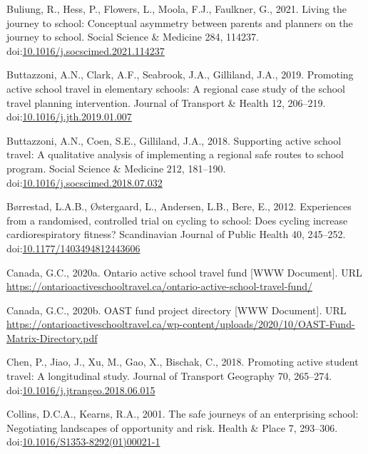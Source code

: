 \documentclass[]{elsarticle} %
\begin{document}
\leavevmode\hypertarget{ref-buliungLivingJourneySchool2021}{}%
Buliung, R., Hess, P., Flowers, L., Moola, F.J., Faulkner, G., 2021.
Living the journey to school: Conceptual asymmetry between parents and
planners on the journey to school. Social Science \& Medicine 284,
114237.
doi:\href{https://doi.org/10.1016/j.socscimed.2021.114237}{10.1016/j.socscimed.2021.114237}

\leavevmode\hypertarget{ref-buttazzoniPromotingActiveSchool2019}{}%
Buttazzoni, A.N., Clark, A.F., Seabrook, J.A., Gilliland, J.A., 2019.
Promoting active school travel in elementary schools: A regional case
study of the school travel planning intervention. Journal of Transport
\& Health 12, 206--219.
doi:\href{https://doi.org/10.1016/j.jth.2019.01.007}{10.1016/j.jth.2019.01.007}

\leavevmode\hypertarget{ref-buttazzoniSupportingActiveSchool2018}{}%
Buttazzoni, A.N., Coen, S.E., Gilliland, J.A., 2018. Supporting active
school travel: A qualitative analysis of implementing a regional safe
routes to school program. Social Science \& Medicine 212, 181--190.
doi:\href{https://doi.org/10.1016/j.socscimed.2018.07.032}{10.1016/j.socscimed.2018.07.032}

\leavevmode\hypertarget{ref-borrestadExperiencesRandomisedControlled2012}{}%
Børrestad, L.A.B., Østergaard, L., Andersen, L.B., Bere, E., 2012.
Experiences from a randomised, controlled trial on cycling to school:
Does cycling increase cardiorespiratory fitness? Scandinavian Journal of
Public Health 40, 245--252.
doi:\href{https://doi.org/10.1177/1403494812443606}{10.1177/1403494812443606}

\leavevmode\hypertarget{ref-GreenCommunities2016}{}%
Canada, G.C., 2020a. Ontario active school travel fund {[}WWW
Document{]}. URL
\url{https://ontarioactiveschooltravel.ca/ontario-active-school-travel-fund/}

\leavevmode\hypertarget{ref-GreenCommunitiesProjects}{}%
Canada, G.C., 2020b. OAST fund project directory {[}WWW Document{]}. URL
\url{https://ontarioactiveschooltravel.ca/wp-content/uploads/2020/10/OAST-Fund-Matrix-Directory.pdf}

\leavevmode\hypertarget{ref-chenPromotingActiveStudent2018}{}%
Chen, P., Jiao, J., Xu, M., Gao, X., Bischak, C., 2018. Promoting active
student travel: A longitudinal study. Journal of Transport Geography 70,
265--274.
doi:\href{https://doi.org/10.1016/j.jtrangeo.2018.06.015}{10.1016/j.jtrangeo.2018.06.015}

\leavevmode\hypertarget{ref-collinsSafeJourneysEnterprising2001}{}%
Collins, D.C.A., Kearns, R.A., 2001. The safe journeys of an
enterprising school: Negotiating landscapes of opportunity and risk.
Health \& Place 7, 293--306.
doi:\href{https://doi.org/10.1016/S1353-8292(01)00021-1}{10.1016/S1353-8292(01)00021-1}
\end{document}

